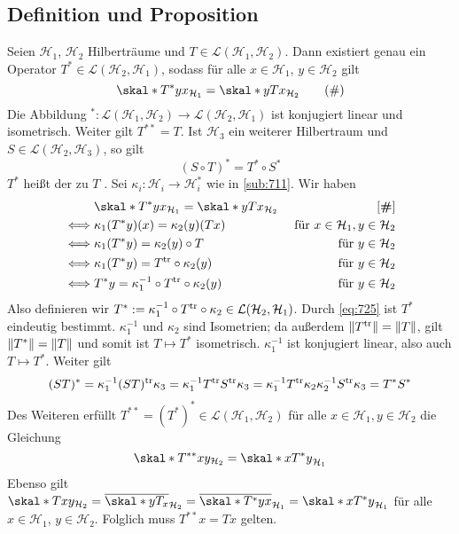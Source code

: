 \subsection[Definition und Proposition: Der zu $T \in \mathcal{L}(\mathcal{H}_1, \mathcal{H}_2)$ adjungierte Operator $T^*$]{Definition und Proposition} %
\label{sub:725}
Seien $\mathcal{H}_1$, $\mathcal{H}_2$ Hilberträume und $T \in \mathcal{L}(\mathcal{H}_1, \mathcal{H}_2)$. Dann existiert genau ein Operator 
$T^* \in \mathcal{L}(\mathcal{H}_2, \mathcal{H}_1)$, sodass für alle $x \in \mathcal{H}_1$, $y \in \mathcal{H}_2$ gilt 
\begin{equation*}
	\skal*{T^* y}{x}_{\mathcal{H}_1} = \skal*{y}{T x}_{\mathcal{H}_2} \label{eq:725} \tag{\#}
\end{equation*}
Die Abbildung ${ }^*  \colon \mathcal{L}(\mathcal{H}_1, \mathcal{H}_2) \to \mathcal{L}(\mathcal{H}_2, \mathcal{H}_1)$ ist konjugiert linear und isometrisch. Weiter gilt
$T^{**} = T$. Ist $\mathcal{H}_3$ ein weiterer Hilbertraum und $S \in \mathcal{L}(\mathcal{H}_2, \mathcal{H}_3)$, so gilt
\[
	(S \circ T)^* = T^* \circ S^*
\]
$T^*$ heißt der zu $T$ .
Sei $\kappa_i \colon \mathcal{H}_i \to \mathcal{H}_i^*$ wie in \ref{sub:711}. Wir haben 
\begin{align*}
	& \skal*{T^* y}{x}_{\mathcal{H}_1} = \skal*{y}{T x}_{\mathcal{H}_2} & \tag*{[\textbf{\#}]} \\
	\iff & \kappa_1(T^* y)(x) =\kappa_2(y)(T x) &\text{ für } x \in \mathcal{H}_1, y \in \mathcal{H}_2 \\
	\iff & \kappa_1(T^* y) =\kappa_2(y)\circ T & \text{ für } y \in \mathcal{H}_2\\
	\iff & \kappa_1(T^* y) = T^\tr \circ \kappa_2(y) &\text{ für } y \in \mathcal{H}_2\\
	\iff & T^* y = \kappa_1 ^{-1} \circ T^\tr \circ \kappa_2(y) &\text{ für } y \in \mathcal{H}_2
\end{align*}
Also definieren wir $T^* := \kappa_1 ^{-1} \circ T^{\mathrm{tr}} \circ \kappa_2 \in \mathcal{L}(\mathcal{H}_2, \mathcal{H}_1)$. Durch \eqref{eq:725} ist $T^*$ eindeutig bestimmt.
$\kappa_1 ^{-1}$ und $\kappa_2$ sind Isometrien; da außerdem $\norm{T^\tr}= \norm{T}$, gilt $\norm{T^*}=\norm{T}$ und somit ist $T \mapsto T^*$ isometrisch.
$\kappa_1 ^{-1}$ ist konjugiert linear, also auch $T \mapsto T^*$. Weiter gilt
\begin{align*}
	(S T)^* = \kappa_1 ^{-1} (S T)^{\mathrm{tr}} \kappa_3 = \kappa_1 ^{-1} T^{\mathrm{tr}} S^{\mathrm{tr}} \kappa_3 = \kappa_1 ^{-1} T^{\mathrm{tr}} \kappa_2 \kappa_2 ^{-1} S^{\mathrm{tr}} \kappa_3 = T^* S^*
\end{align*}
Des Weiteren erfüllt $T^{**} = (T^*)^* \in \mathcal{L}(\mathcal{H}_1, \mathcal{H}_2)$ für alle $x \in \mathcal{H}_1, y \in \mathcal{H}_2$ die Gleichung
\[
	\skal*{T^{**} x}{y}_{\mathcal{H}_2} = \skal*{x}{T^* y}_{\mathcal{H}_1}
\]
Ebenso gilt $\skal*{T x}{y}_{\mathcal{H}_2}= \overline{\skal*{y}{T_x}}_{\mathcal{H}_2} = \overline{\skal*{T^* y}{x}}_{\mathcal{H}_1} = \skal*{x}{T^* y}_{\mathcal{H}_1}$ für
alle $x \in \mathcal{H}_1$, $y \in \mathcal{H}_2$. Folglich muss $T^{**} x = T x$ gelten.\bewende

